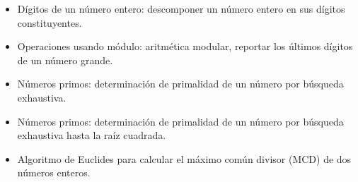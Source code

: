\begin{itemize}
\item[\basic] Dígitos de un número entero: descomponer un número entero en sus
  dígitos constituyentes.
\item[\basic] Operaciones usando módulo: aritmética modular, reportar los
  últimos dígitos de un número grande.
\item[\basic] Números primos: determinación de primalidad de un número por
  búsqueda exhaustiva.
\item[\advanced] Números primos: determinación de primalidad de un número por
  búsqueda exhaustiva hasta la raíz cuadrada.
\item[\advanced] Algoritmo de Euclides para  calcular el máximo común divisor (MCD) de dos números enteros.
\end{itemize}

